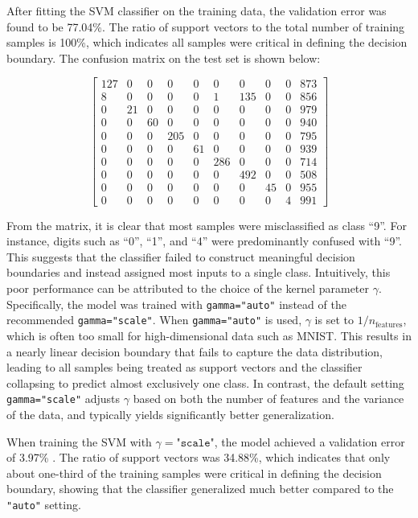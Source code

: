 \documentclass[11pt, reqno, letterpaper, twoside]{amsart}
\theoremstyle{plain}
\theoremstyle{definition}
\begin{document}
After fitting the SVM classifier on the training data, the validation error was found to be 
77.04\%. The ratio of support vectors to the total number of training samples is 
100\%, which indicates all samples were critical in defining the decision boundary. The confusion matrix on the test set is shown below:

\[
\begin{bmatrix}
127 & 0 & 0 & 0 & 0 & 0 & 0 & 0 & 0 & 873 \\
8 & 0 & 0 & 0 & 0 & 1 & 135 & 0 & 0 & 856 \\
0 & 21 & 0 & 0 & 0 & 0 & 0 & 0 & 0 & 979 \\
0 & 0 & 60 & 0 & 0 & 0 & 0 & 0 & 0 & 940 \\
0 & 0 & 0 & 205 & 0 & 0 & 0 & 0 & 0 & 795 \\
0 & 0 & 0 & 0 & 61 & 0 & 0 & 0 & 0 & 939 \\
0 & 0 & 0 & 0 & 0 & 286 & 0 & 0 & 0 & 714 \\
0 & 0 & 0 & 0 & 0 & 0 & 492 & 0 & 0 & 508 \\
0 & 0 & 0 & 0 & 0 & 0 & 0 & 45 & 0 & 955 \\
0 & 0 & 0 & 0 & 0 & 0 & 0 & 0 & 4 & 991
\end{bmatrix}
\]

From the matrix, it is clear that most samples were misclassified as class ``9''. 
For instance, digits such as ``0'', ``1'', and ``4'' were predominantly confused with ``9''. 
This suggests that the classifier failed to construct meaningful decision boundaries 
and instead assigned most inputs to a single class. 
Intuitively, this poor performance can be attributed to the choice of the kernel parameter $\gamma$. 
Specifically, the model was trained with \texttt{gamma="auto"} instead of the recommended \texttt{gamma="scale"}. 
When \texttt{gamma="auto"} is used, $\gamma$ is set to $1/n_{\text{features}}$, which is often too small for high-dimensional data such as MNIST. 
This results in a nearly linear decision boundary that fails to capture the data distribution, 
leading to all samples being treated as support vectors and the classifier collapsing to predict almost exclusively one class. 
In contrast, the default setting \texttt{gamma="scale"} adjusts $\gamma$ based on both the number of features and the variance of the data, 
and typically yields significantly better generalization.

When training the SVM with $\gamma=\texttt{"scale"}$, the model achieved a validation error of 
3.97\% . The ratio of support vectors was 34.88\%, which indicates that 
only about one-third of the training samples were critical in defining the decision boundary, 
showing that the classifier generalized much better compared to the \texttt{"auto"} setting.
\end{document}

